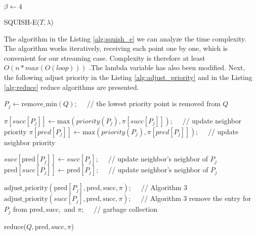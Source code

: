 \begin{algorithm}[H]
    \DontPrintSemicolon
    $\beta \gets 4$ 
    \caption{SQUISH-E($T, \lambda$)}
    \label{alg:squish_e}
\end{algorithm}

The algorithm in the Listing \ref{alg:squish_e} we can analyze the time complexity. The algorithm works iteratively, receiving each point one by one, which is convenient for our streaming case. Complexity is therefore at least $O(n * max(O(loop) ))$ .The lambda variable has also been modified. Next, the following adjust priority in the Listing \ref{alg:adjust_priority} and in the Listing \ref{alg:reduce} reduce algorithms are presented.


\begin{algorithm}[H]
    \DontPrintSemicolon

    $P_j \gets \text{remove\_min}(Q); \quad$ // the lowest priority point is removed from $Q$\;

    $\pi[succ[P_j]] \gets \text{max}(priority(P_j) , \pi[succ[P_j]]); \quad$  // update neighbor priority\;
    $\pi[pred[P_j]] \gets \text{max}(priority(P_j) , \pi[pred[P_j]]); \quad$ // update neighbor priority\;


    $succ[\text{pred}[P_j]] \gets succ[P_j]; \quad$ // update neighbor's neighbor of $P_j$ \;
    $\text{pred}[succ[P_j]] \gets \text{pred}[P_j]; \quad$ // update neighbor's neighbor of $P_j$ \;


    $\text{adjust\_priority}(\text{pred}[P_j], \text{pred}, \text{succ}, \pi); \quad$ // Algorithm 3\;
    $\text{adjust\_priority}(succ[P_j], \text{pred}, \text{succ}, \pi); \quad$ // Algorithm 3\;
    remove the entry for $P_j$ from $\text{pred}, \text{succ},$ and $\pi; \quad$ // garbage collection\;

    \caption{reduce($Q, \text{pred}, \text{succ}, \pi$)}
    \label{alg:reduce}
\end{algorithm}



